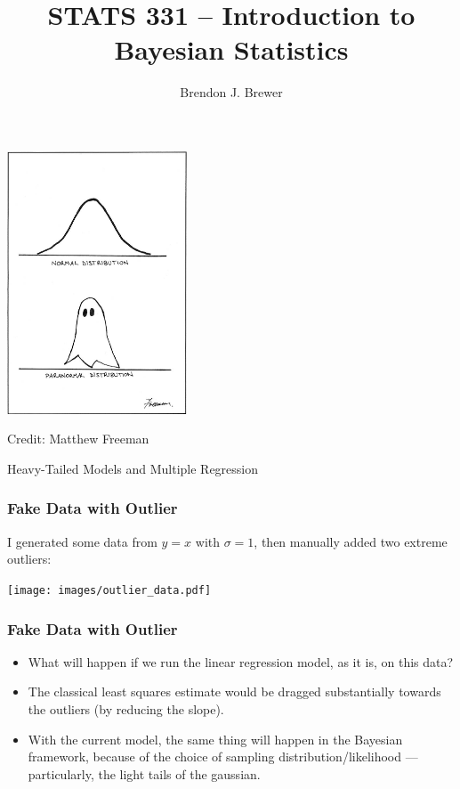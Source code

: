 \documentclass{beamer}
\author{Brendon J. Brewer}
\title{STATS 331 -- Introduction to Bayesian Statistics}
\institute{The University of Auckland}
\date{}
\begin{document}
\frame{\titlepage}

\begin{frame}
\begin{center}
\includegraphics[width=0.4\textwidth]{images/paranormal.png}

Credit: Matthew Freeman
\end{center}

\end{frame}



\begin{frame}
\centering
\large
Heavy-Tailed Models and Multiple Regression

\end{frame}


\begin{frame}
\frametitle{Fake Data with Outlier}
I generated some data from $y=x$ with $\sigma=1$, then manually added two
extreme outliers:

\begin{center}
\texttt{[image: images/outlier\_data.pdf]}
\end{center}

\end{frame}

\begin{frame}
\frametitle{Fake Data with Outlier}
\begin{itemize}
\item What will happen if we run the linear regression model, as it is, on this
data? \pause
\item The classical least squares estimate would be dragged substantially towards
the outliers (by reducing the slope).\pause
\item With the current model, the same thing will happen in the Bayesian framework,
because of the choice of sampling distribution/likelihood --- particularly,
the light tails of the gaussian.
\end{itemize}
\end{frame}
\end{document}
